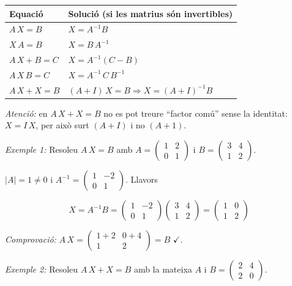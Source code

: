 \begin{table}[!htbp]
\centering
\renewcommand{\arraystretch}{1.3}
\begin{tabularx}{\textwidth}{l>{\raggedright\arraybackslash}X}
\toprule
Equació & Solució (si les matrius són invertibles) \\
\midrule
$A\,X=B$ & $X=A^{-1}B$ \\
$X\,A=B$ & $X=B\,A^{-1}$ \\
$A\,X+B=C$ & $X=A^{-1}(C-B)$ \\
$A\,X\,B=C$ & $X=A^{-1}\,C\,B^{-1}$ \\
$A\,X+X=B$ & $(A+I)\,X=B\Rightarrow X=(A+I)^{-1}B$ \\
\bottomrule
\end{tabularx}
\end{table}

\emph{Atenció:} en $A\,X+X=B$ no es pot treure ``factor comú'' sense la identitat: $X=I\,X$, per això surt $(A+I)$ i no $(A+1)$.

\emph{Exemple 1:} Resoleu $A\,X=B$ amb $A=\begin{pmatrix}1&2\\0&1\end{pmatrix}$ i $B=\begin{pmatrix}3&4\\1&2\end{pmatrix}$.

$|A|=1\neq0$ i $A^{-1}=\begin{pmatrix}1&-2\\0&1\end{pmatrix}$. Llavors

\begin{equation*}
X=A^{-1}B=\begin{pmatrix}1&-2\\0&1\end{pmatrix}\begin{pmatrix}3&4\\1&2\end{pmatrix}=\begin{pmatrix}1&0\\1&2\end{pmatrix}
\end{equation*}

\emph{Comprovació:} $A\,X=\begin{pmatrix}1+2&0+4\\1&2\end{pmatrix}=B$ $\checkmark$.

\emph{Exemple 2:} Resoleu $A\,X+X=B$ amb la mateixa $A$ i $B=\begin{pmatrix}2&4\\2&0\end{pmatrix}$.

